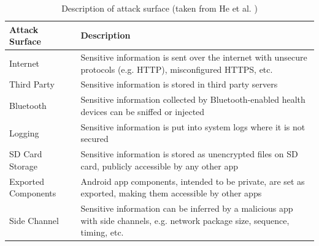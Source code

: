 \begin{table}[t]
	\caption {Description of attack surface (taken from He et al. \cite{he2014security})}
	\label{tab:attacksurfaces}
	\begin{tabular}{|>{\raggedright}p{2cm}|>{\raggedright\arraybackslash}p{10cm}|}
		\hline
		\textbf{Attack Surface}      & \textbf{Description}                                                                                                                    \\ \hline
		Internet            & Sensitive information is sent over the internet with unsecure protocols (e.g. HTTP), misconfigured HTTPS, etc.                 \\ \hline
		Third Party         & Sensitive information is stored in third party servers                                                                         \\ \hline
		Bluetooth           & Sensitive information collected by Bluetooth-enabled health devices can be sniffed or injected                                 \\ \hline
		Logging             & Sensitive information is put into system logs where it is not secured                                                          \\ \hline
		SD Card Storage     & Sensitive information is stored as unencrypted files on SD card, publicly accessible by any other app                          \\ \hline
		Exported Components &  Android app components, intended to be private, are set as exported, making them accessible by other apps                     \\ \hline
		Side Channel        & Sensitive information can be inferred by a malicious app with side channels, e.g. network package size, sequence, timing, etc. \\ \hline
	\end{tabular}
\end{table}

